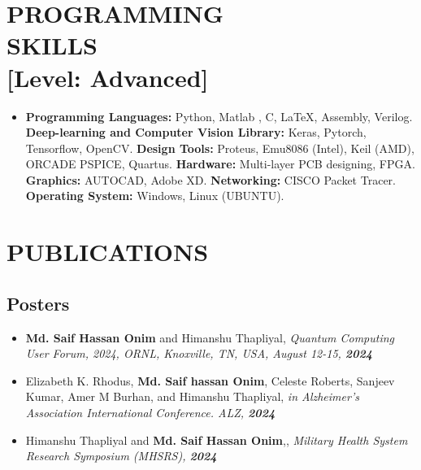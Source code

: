 \documentclass[margin]{res}
\begin{document}
\begin{resume}
\section{PROGRAMMING\\SKILLS\\\textbf{[Level: Advanced]}}
\begin{itemize}
\item \textbf{Programming Languages:} Python, Matlab , C, LaTeX, Assembly, Verilog. \textbf{Deep-learning and Computer Vision Library:} Keras, Pytorch, Tensorflow, OpenCV. \textbf{Design Tools:} Proteus, Emu8086 (Intel), Keil (AMD), ORCADE PSPICE, Quartus. \textbf{Hardware:} Multi-layer PCB designing, FPGA. \textbf{Graphics:} AUTOCAD, Adobe XD. \textbf{Networking:} CISCO Packet Tracer. \textbf{Operating System:} Windows, Linux (UBUNTU).
\end{itemize}


\section{PUBLICATIONS}
\subsection{Posters}
\begin{itemize}

\item \textbf{Md. Saif Hassan Onim} and Himanshu Thapliyal,  \textit{Quantum Computing User Forum, 2024, ORNL, Knoxville, TN, USA, August 12-15, \textbf{2024}}

\item Elizabeth K. Rhodus, \textbf{Md. Saif hassan Onim}, Celeste Roberts, Sanjeev Kumar, Amer M Burhan, and Himanshu Thapliyal,  \textit{in Alzheimer’s Association International Conference. ALZ, \textbf{2024}}

\item Himanshu Thapliyal and \textbf{Md. Saif Hassan Onim},, \textit{Military Health System Research Symposium (MHSRS), \textbf{2024}}


\end{itemize}
\end{resume}
\end{document}
